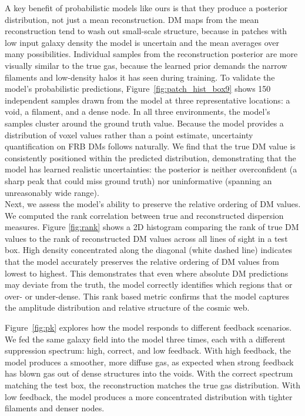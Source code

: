 \documentclass[twocolumn]{aastex631}
\begin{document}
A key benefit of probabilistic models like ours is that they produce a posterior distribution, not just a mean reconstruction. DM maps from the mean reconstruction tend to wash out small-scale structure, because in patches with low input galaxy density the model is uncertain and the mean averages over many possibilities. Individual samples from the reconstruction posterior are more visually similar to the true gas, because the learned prior demands the narrow filaments and low-density halos it has seen during training. To validate the model's probabilistic predictions, Figure~\ref{fig:patch_hist_box9} shows 150 independent samples drawn from the model at three representative locations: a void, a filament, and a dense node. In all three environments, the model's samples cluster around the ground truth value. Because the model provides a distribution of voxel values rather than a point estimate, uncertainty quantification on FRB DMs follows naturally. We find that the true DM value is consistently positioned within the predicted distribution, demonstrating that the model has learned realistic uncertainties: the posterior is neither overconfident (a sharp peak that could miss ground truth) nor uninformative (spanning an unreasonably wide range).
\\
Next, we assess the model's ability to preserve the relative ordering of DM values. We computed the rank correlation between true and reconstructed dispersion measures. Figure \ref{fig:rank} shows a 2D histogram comparing the rank of true DM values to the rank of reconstructed DM values across all lines of sight in a test box. High density concentrated along the diagonal (white dashed line) indicates that the model accurately preserves the relative ordering of DM values from lowest to highest. This demonstrates that even where absolute DM predictions may deviate from the truth, the model correctly identifies which regions that or over- or under-dense. This rank based metric confirms that the model captures the amplitude distribution and relative structure of the cosmic web.\\

\figFeedback

Figure~\ref{fig:pk} explores how the model responds to different feedback scenarios. We fed the same galaxy field into the model three times, each with a different suppression spectrum: high, correct, and low feedback. With high feedback, the model produces a smoother, more diffuse gas, as expected when strong feedback has blown gas out of dense structures into the voids. With the correct spectrum matching the test box, the reconstruction matches the true gas distribution. With low feedback, the model produces a more concentrated distribution with tighter filaments and denser nodes. 
\end{document}
